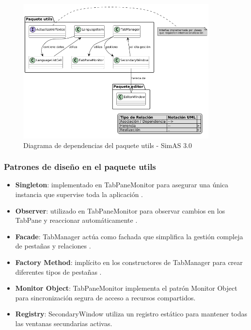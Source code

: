 \begin{figure}[H]
    \centering
    \includegraphics[width=0.9\textwidth]{figuras/Cap9/diagrama_utils.png}
    \caption{Diagrama de dependencias del paquete utils - SimAS 3.0}
    \label{fig:diagrama_utils}
\end{figure}

\subsubsection{Patrones de diseño en el paquete utils}

\begin{itemize}
    \item \textbf{Singleton}: implementado en TabPaneMonitor para asegurar una única instancia que supervise toda la aplicación \cite{gamma1995design}.
    \item \textbf{Observer}: utilizado en TabPaneMonitor para observar cambios en los TabPane y reaccionar automáticamente \cite{gamma1995design}.
    \item \textbf{Facade}: TabManager actúa como fachada que simplifica la gestión compleja de pestañas y relaciones \cite{gamma1995design}.
    \item \textbf{Factory Method}: implícito en los constructores de TabManager para crear diferentes tipos de pestañas \cite{gamma1995design}.
    \item \textbf{Monitor Object}: TabPaneMonitor implementa el patrón Monitor Object para sincronización segura de acceso a recursos compartidos.
    \item \textbf{Registry}: SecondaryWindow utiliza un registro estático para mantener todas las ventanas secundarias activas.
\end{itemize}

